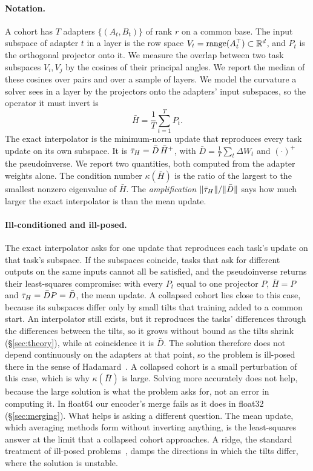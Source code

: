\paragraph{Notation.} A cohort has $T$ adapters $\{(A_t, B_t)\}$ of rank $r$
on a common base. The input subspace of adapter $t$ in a layer is the row
space $V_t = \operatorname{range}(A_t^\top) \subset \mathbb{R}^d$, and $P_t$ is the orthogonal
projector onto it. We measure the overlap between two task subspaces
$V_i, V_j$ by the cosines of their principal angles. We report the median of
these cosines over pairs and over a sample of layers. We model the curvature
a solver sees in a layer by the projectors onto the adapters' input
subspaces, so the operator it must invert is
\begin{equation}\label{eq:hbar}
  \bar H = \frac1T \sum_{t=1}^T P_t.
\end{equation}
The exact interpolator is the minimum-norm update that reproduces every task
update on its own subspace. It is $\bar{\tau}_H = \bar D\,\bar H^{+}$, with
$\bar D = \tfrac1T\sum_t \Delta W_t$ and $(\cdot)^+$ the pseudoinverse. We
report two quantities, both computed from the adapter weights alone. The
condition number $\kappa(\bar H)$ is the ratio of the largest to the smallest
nonzero eigenvalue of $\bar H$. The \emph{amplification}
$\|\bar{\tau}_H\| / \|\bar D\|$ says how much larger the exact interpolator is than
the mean update.

\paragraph{Ill-conditioned and ill-posed.} The exact interpolator asks for one
update that reproduces each task's update on that task's subspace. If the
subspaces coincide, tasks that ask for different outputs on the same inputs
cannot all be satisfied, and the pseudoinverse returns their least-squares
compromise: with every $P_t$ equal to one projector $P$, $\bar H = P$ and
$\bar{\tau}_H = \bar D P = \bar D$, the mean update. A collapsed cohort lies close to
this case, because its subspaces differ only by small tilts that training
added to a common start. An interpolator still exists, but it reproduces the
tasks' differences through the differences between the tilts, so it grows
without bound as the tilts shrink (\S\ref{sec:theory}), while at coincidence
it is $\bar D$. The solution therefore does not depend continuously on the
adapters at that point, so the problem is ill-posed there in the sense of
Hadamard~\citep{engl1996regularization}. A collapsed cohort is a small
perturbation of this case, which is why $\kappa(\bar H)$ is large. Solving more
accurately does not help, because the large solution is what the problem asks
for, not an error in computing it. In float64 our encoder's merge fails as it
does in float32 (\S\ref{sec:merging}). What helps is asking a different
question. The mean update, which averaging methods form without inverting
anything, is the least-squares answer at the limit that a collapsed cohort
approaches. A ridge, the standard treatment of ill-posed
problems~\citep{engl1996regularization}, damps the directions in which the
tilts differ, where the solution is unstable.
